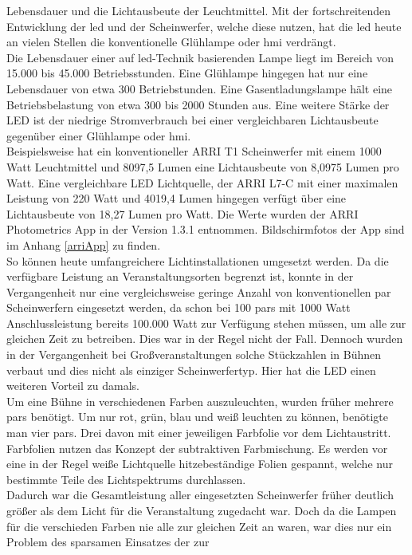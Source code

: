 \documentclass[11pt]{scrartcl}
\begin{document}
Lebensdauer und die Lichtausbeute der Leuchtmittel. Mit der fortschreitenden Entwicklung der \ac{led} und der
Scheinwerfer, welche diese nutzen, hat die \ac{led} heute an vielen Stellen die konventionelle Glühlampe oder \ac{hmi} verdrängt.\\
Die Lebensdauer einer auf \ac{led}-Technik basierenden Lampe liegt im Bereich von 15.000 bis 45.000 Betriebsstunden. Eine Glühlampe hingegen
hat nur eine Lebensdauer von etwa 300 Betriebstunden. Eine Gasentladungslampe hält eine Betriebsbelastung von etwa 300 bis 2000 Stunden aus.
Eine weitere Stärke der LED ist der niedrige Stromverbrauch bei einer vergleichbaren Lichtausbeute gegenüber einer Glühlampe oder \ac{hmi}.\\
Beispielsweise hat ein konventioneller ARRI T1 Scheinwerfer mit einem 1000 Watt Leuchtmittel und 8097,5 Lumen eine Lichtausbeute von 8,0975
Lumen pro Watt. Eine vergleichbare LED Lichtquelle, der ARRI L7-C mit einer maximalen Leistung von 220 Watt \cite{arriL7} und 4019,4 Lumen hingegen
verfügt über eine Lichtausbeute von 18,27 Lumen pro Watt. Die Werte wurden der ARRI Photometrics App in der Version 1.3.1 entnommen. Bildschirmfotos
der App sind im Anhang \ref{arriApp} zu finden.\\
So können heute umfangreichere Lichtinstallationen umgesetzt werden. Da die verfügbare Leistung an Veranstaltungsorten begrenzt ist, konnte
in der Vergangenheit nur eine vergleichsweise geringe Anzahl von konventionellen \ac{par} Scheinwerfern eingesetzt werden, da schon bei 100
\ac{par}s mit 1000 Watt Anschlussleistung bereits 100.000 Watt zur Verfügung stehen müssen, um alle zur gleichen Zeit zu betreiben. Dies
war in der Regel nicht der Fall. Dennoch wurden in der Vergangenheit bei Großveranstaltungen solche Stückzahlen in Bühnen verbaut und dies
nicht als einziger Scheinwerfertyp. Hier hat die LED einen weiteren Vorteil zu damals.\\
Um eine Bühne in verschiedenen Farben auszuleuchten, wurden früher mehrere \ac{par}s benötigt. Um nur rot, grün, blau und weiß leuchten zu
können, benötigte man vier \ac{par}s. Drei davon mit einer jeweiligen Farbfolie vor dem Lichtaustritt. Farbfolien nutzen das Konzept der
subtraktiven Farbmischung. Es werden vor eine in der Regel weiße Lichtquelle hitzebeständige Folien gespannt, welche nur bestimmte Teile
des  Lichtspektrums durchlassen.\\
Dadurch war die Gesamtleistung aller eingesetzten Scheinwerfer früher deutlich größer als dem Licht für die Veranstaltung zugedacht war.
Doch da die Lampen für die verschieden Farben nie alle zur gleichen Zeit an waren, war dies nur ein Problem des sparsamen Einsatzes der zur
\end{document}
